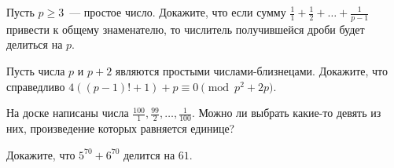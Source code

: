 \documentclass{article}
\begin{document}
\begin{enumerate_boxed}
        \item Пусть $p \geqslant 3$~--- простое число.
        Докажите, что если сумму $\frac{1}{1} + \frac{1}{2} + \ldots+\frac{1}{p-1}$ привести к общему знаменателю, то числитель получившейся дроби будет делиться на $p$.

        \item Пусть числа $p$ и $p + 2$ являются простыми числами-близнецами.
        Докажите,
        что справедливо $4((p - 1)! + 1) + p \equiv 0 \pmod{p^2+2p}$.

        \item  На доске написаны числа $\frac{100}{1}, \frac{99}{2}, \ldots, \frac{1}{100}$.
        Можно ли выбрать какие-то девять из них, произведение которых равняется единице?

        \item Докажите, что $5^{70} + 6^{70}$ делится на $61$.
        
    \end{enumerate_boxed}
\end{document}
